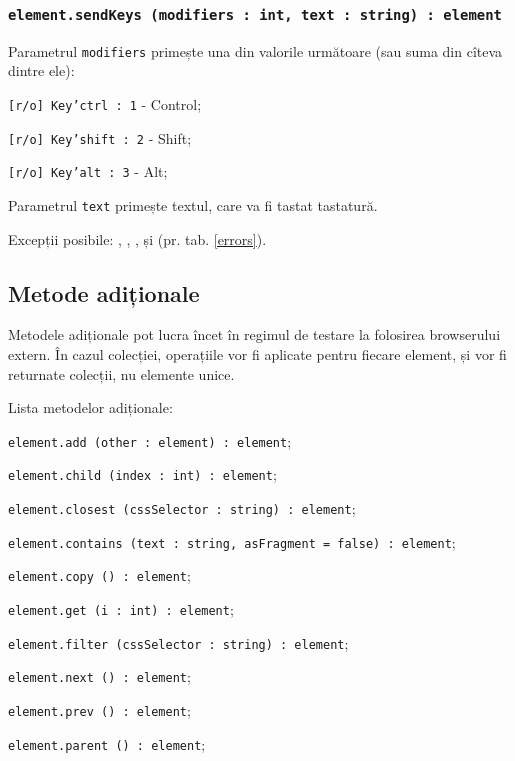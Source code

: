 \subsubsection{\texttt{element.sendKeys (modifiers : int, text : string) : element}}

Parametrul \texttt{modifiers} primește una din valorile următoare (sau suma din cîteva dintre ele):
\begin{icItems}
	\item \texttt{[r/o] Key'ctrl : 1} - Control;
	\item \texttt{[r/o] Key'shift : 2} - Shift;
	\item \texttt{[r/o] Key'alt : 3} - Alt;
\end{icItems}

Parametrul \texttt{text} primește textul, care va fi tastat tastatură.

Excepții posibile: , , ,   și  (pr. tab. \ref{errors}).

\subsection{Metode adiționale}

Metodele adiționale pot lucra încet în regimul de testare la folosirea browserului extern. În cazul colecției, operațiile vor fi aplicate pentru fiecare element, și vor fi returnate colecții, nu elemente unice. 

Lista metodelor adiționale:
\begin{icItems}
	\item \texttt{element.add (other : element) : element};
	\item \texttt{element.child (index : int) : element};
	\item \texttt{element.closest (cssSelector : string) : element};
	\item \texttt{element.contains (text : string, asFragment = false) : element};
	\item \texttt{element.copy () : element};
	\item \texttt{element.get (i : int) : element};
	\item \texttt{element.filter (cssSelector : string) : element};
	\item \texttt{element.next () : element};
	\item \texttt{element.prev () : element};
	\item \texttt{element.parent () : element};
\end{icItems}

